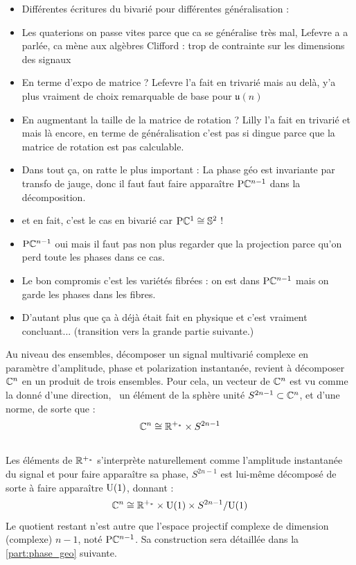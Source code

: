 \begin{itemize}
	
	\item Différentes écritures du bivarié pour différentes généralisation :
	
	\item Les quaterions on passe vites parce que ca se généralise très mal, Lefevre a a parlée, ca mène aux algèbres Clifford : trop de contrainte sur les dimensions des signaux
	
	\item En terme d'expo de matrice ? Lefevre \cite[sec. I.3]{lefevre_polarization_2021} l'a fait en trivarié mais au delà, y'a plus vraiment de choix remarquable de base pour $\mathfrak{u}(n)$
	
	\item En augmentant la taille de la matrice de rotation ? Lilly \cite{lilly_modulated_2011} l'a fait en trivarié et mais là encore, en terme de généralisation c'est pas si dingue parce que la matrice de rotation est pas calculable.
	
	\item Dans tout ça, on ratte le plus important : La phase géo est invariante par transfo de jauge, donc il faut faut faire apparaître $\text{\normalfont P}\mathbb{C}^{n-1}$ dans la décomposition.
	
	\item et en fait, c'est le cas en bivarié car $\text{\normalfont P}\mathbb{C}^{1}\cong \mathbb{ S}^{2}$ !
	
	\item $\text{\normalfont P}\mathbb{C}^{n-1}$ oui mais il faut pas non plus regarder que la projection parce qu'on perd toute les phases dans ce cas.
	
	\item Le bon compromis c'est les variétés fibrées : on est dans $\text{\normalfont P}\mathbb{C}^{n-1}$ mais on garde les phases dans les fibres.
	
	\item D'autant plus que ça à déjà était fait en physique et c'est vraiment concluant... (transition vers la grande partie suivante.)
	
\end{itemize}

Au niveau des ensembles, décomposer un signal multivarié complexe en paramètre d'amplitude, phase et polarization instantanée, revient à décomposer $\mathbb{C}^n$ en un produit de trois ensembles. Pour cela, un vecteur de $\mathbb{C}^n$ est vu comme la donné d'une direction, \ie~un élément de la sphère unité $S^{2n-1}\subset\mathbb{C}^n$, et d'une norme, de sorte que :
\[\mathbb{C}^n \cong \mathbb{R}^{+_*} \times S^{2n-1}\]
\\
Les éléments de $\mathbb{R}^{+_*}$ s'interprète naturellement comme l'amplitude instantanée du signal et pour faire apparaître sa phase, $S^{2n-1}$ est lui-même décomposé de sorte à faire apparaître $\text{\normalfont U}(1)$, donnant :
\[\mathbb{C}^n \cong \mathbb{R}^{+_*} \times \text{\normalfont U}(1) \times S^{2n-1}/\text{\normalfont U}(1)\]
Le quotient restant n'est autre que l'espace projectif complexe de dimension (complexe) $n-1$, noté $\text{\normalfont P}\mathbb{C}^{n-1}$. Sa construction sera détaillée dans la \cref{part:phase_geo} suivante.
\\

